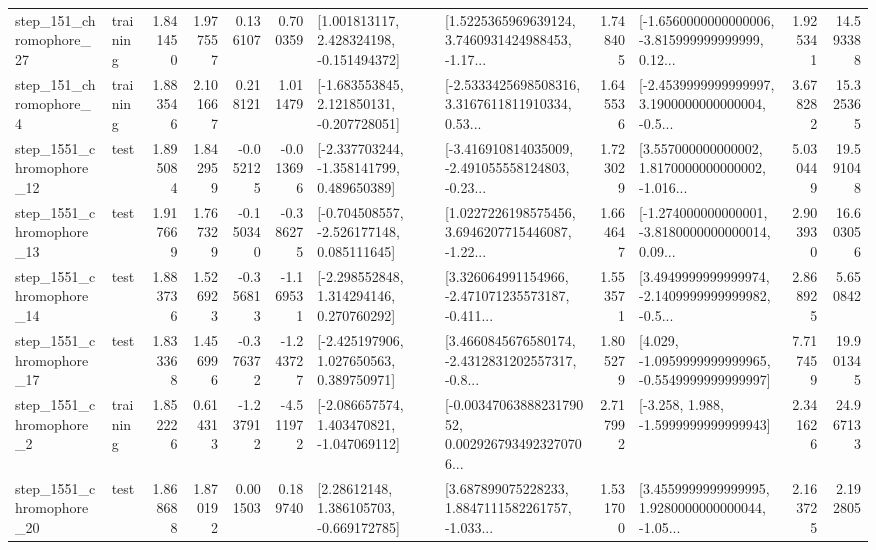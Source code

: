 \begin{tabular}{llrrrrllrlrr}
  step\_151\_chromophore\_27 &  training &      1.841450 &    1.977557 &      0.136107 &  0.700359 &    [1.001813117, 2.428324198, -0.151494372] &  [1.5225365969639124, 3.7460931424988453, -1.17... &       1.748405 &  [-1.6560000000000006, -3.815999999999999, 0.12... &            1.925341 &         14.593388 \\
   step\_151\_chromophore\_4 &  training &      1.883546 &    2.101667 &      0.218121 &  1.011479 &   [-1.683553845, 2.121850131, -0.207728051] &  [-2.5333425698508316, 3.3167611811910334, 0.53... &       1.645536 &  [-2.4539999999999997, 3.1900000000000004, -0.5... &            3.678282 &         15.325365 \\
 step\_1551\_chromophore\_12 &      test &      1.895084 &    1.842959 &     -0.052125 & -0.013696 &   [-2.337703244, -1.358141799, 0.489650389] &  [-3.416910814035009, -2.491055558124803, -0.23... &       1.723029 &  [3.557000000000002, 1.8170000000000002, -1.016... &            5.030449 &         19.591048 \\
 step\_1551\_chromophore\_13 &      test &      1.917669 &    1.767329 &     -0.150340 & -0.386275 &   [-0.704508557, -2.526177148, 0.085111645] &  [1.0227226198575456, 3.6946207715446087, -1.22... &       1.664647 &  [-1.274000000000001, -3.8180000000000014, 0.09... &            2.903930 &         16.603056 \\
 step\_1551\_chromophore\_14 &      test &      1.883736 &    1.526923 &     -0.356813 & -1.169531 &    [-2.298552848, 1.314294146, 0.270760292] &  [3.326064991154966, -2.471071235573187, -0.411... &       1.553571 &  [3.4949999999999974, -2.1409999999999982, -0.5... &            2.868925 &          5.650842 \\
 step\_1551\_chromophore\_17 &      test &      1.833368 &    1.456996 &     -0.376372 & -1.243727 &    [-2.425197906, 1.027650563, 0.389750971] &  [3.4660845676580174, -2.4312831202557317, -0.8... &       1.805279 &  [4.029, -1.0959999999999965, -0.5549999999999997] &            7.717459 &         19.901345 \\
  step\_1551\_chromophore\_2 &  training &      1.852226 &    0.614313 &     -1.237912 & -4.511972 &   [-2.086657574, 1.403470821, -1.047069112] &  [-0.0034706388823179052, 0.0029267934923270706... &       2.717992 &               [-3.258, 1.988, -1.5999999999999943] &            2.341626 &         24.967133 \\
 step\_1551\_chromophore\_20 &      test &      1.868688 &    1.870192 &      0.001503 &  0.189740 &     [2.28612148, 1.386105703, -0.669172785] &  [3.687899075228233, 1.8847111582261757, -1.033... &       1.531700 &  [3.4559999999999995, 1.9280000000000044, -1.05... &            2.163725 &          2.192805 \\

\end{tabular}
